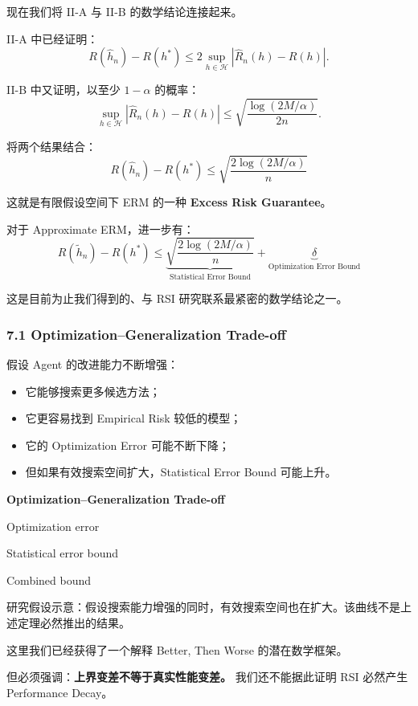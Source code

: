 现在我们将 II-A 与 II-B 的数学结论连接起来。

II-A 中已经证明：
\[R(\hat h_n)-R(h^*)
\leq
2\sup_{h\in\mathcal H}
|\widehat R_n(h)-R(h)|.\]

II-B 中又证明，以至少 \(1-\alpha\) 的概率：
\[\sup_{h\in\mathcal H}
|\widehat R_n(h)-R(h)|
\leq
\sqrt{\frac{\log(2M/\alpha)}{2n}}.\]

将两个结果结合：
\[\boxed{
R(\hat h_n)-R(h^*)
\leq
\sqrt{
\frac{2\log(2M/\alpha)}{n}
}
}\]

这就是有限假设空间下 ERM 的一种 \textbf{Excess Risk Guarantee}。

对于 Approximate ERM，进一步有：
\[\boxed{
R(\tilde h_n)-R(h^*)
\leq
\underbrace{
\sqrt{\frac{2\log(2M/\alpha)}n}
}_{\text{Statistical Error Bound}}
+
\underbrace{\delta}_{\text{Optimization Error Bound}}
}\]

这是目前为止我们得到的、与 RSI 研究联系最紧密的数学结论之一。

\hypertarget{part-2-14-0001-optimizationgeneralization-trade-off}{%
\subsubsection{7.1 Optimization--Generalization Trade-off}\label{part-2-14-0001-optimizationgeneralization-trade-off}}

假设 Agent 的改进能力不断增强：

\begin{itemize}
\tightlist
\item
  它能够搜索更多候选方法；
\item
  它更容易找到 Empirical Risk 较低的模型；
\item
  它的 Optimization Error 可能不断下降；
\item
  但如果有效搜索空间扩大，Statistical Error Bound 可能上升。
\end{itemize}

\textbf{Optimization--Generalization Trade-off}


Optimization error

Statistical error bound

Combined bound

研究假设示意：假设搜索能力增强的同时，有效搜索空间也在扩大。该曲线不是上述定理必然推出的结果。

这里我们已经获得了一个解释 Better, Then Worse 的潜在数学框架。

但必须强调：\textbf{上界变差不等于真实性能变差。} 我们还不能据此证明 RSI 必然产生 Performance Decay。

